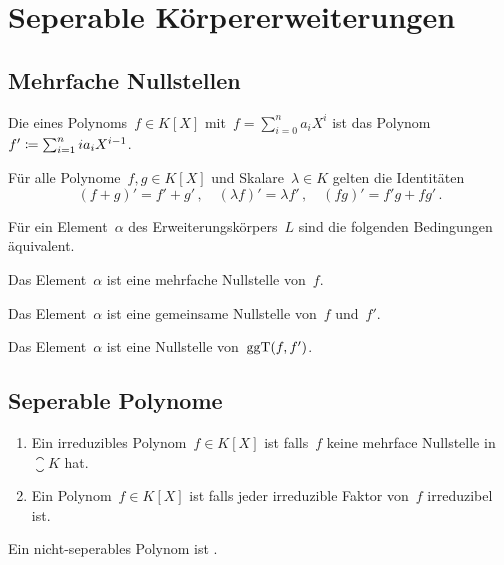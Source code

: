 \section{Seperable Körpererweiterungen}



\subsection{Mehrfache Nullstellen}

\begin{definition}
  Die  eines Polynoms~$f \in K[X]$ mit~$f = \sum_{i=0}^n a_i X^i$ ist das Polynom~$f' \coloneqq \sum_{i=1}^n i a_i X^{i-1}$.
\end{definition}

\begin{lemma}
  Für alle Polynome~$f, g \in K[X]$ und Skalare~$\lambda \in K$ gelten die Identitäten
  \[
    (f + g)' = f' + g' \,,
    \quad
    (\lambda f)' = \lambda f' \,,
    \quad
    (fg)' = f' g + f g' \,.
  \]
\end{lemma}

\begin{proposition}
  Für ein Element~$\alpha$ des Erweiterungskörpers~$L$ sind die folgenden Bedingungen äquivalent.
  \begin{equivlist}
    \item
      Das Element~$\alpha$ ist eine mehrfache Nullstelle von~$f$.
    \item
      Das Element~$\alpha$ ist eine gemeinsame Nullstelle von~$f$ und~$f'$.
    \item
      Das Element~$\alpha$ ist eine Nullstelle von~$\operatorname{ggT}(f,f')$.
  \end{equivlist}
\end{proposition}



\subsection{Seperable Polynome}

\begin{definition}
  \leavevmode
  \begin{enumerate}
    \item
      Ein irreduzibles Polynom~$f \in K[X]$ ist  falls~$f$ keine mehrface Nullstelle in~$\closure{K}$ hat.
    \item
      Ein Polynom~$f \in K[X]$ ist  falls jeder irreduzible Faktor von~$f$ irreduzibel ist.
  \end{enumerate}
  Ein nicht-seperables Polynom ist .
\end{definition}

